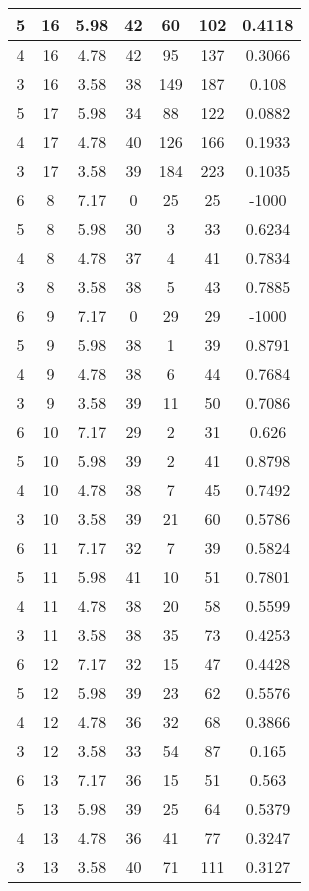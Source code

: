 \documentclass[letterpaper, 12pt]{article}
\begin{document}
\begin{longtable}{|c|c|c|c|c|c|c|}
\hline
5 & 16 & 5.98 & 42 & 60 & 102 & 0.4118 \\
\hline
4 & 16 & 4.78 & 42 & 95 & 137 & 0.3066 \\
\hline
3 & 16 & 3.58 & 38 & 149 & 187 & 0.108 \\
\hline
5 & 17 & 5.98 & 34 & 88 & 122 & 0.0882 \\
\hline
4 & 17 & 4.78 & 40 & 126 & 166 & 0.1933 \\
\hline
3 & 17 & 3.58 & 39 & 184 & 223 & 0.1035 \\
\hline
6 & 8 & 7.17 & 0 & 25 & 25 & -1000 \\
\hline
5 & 8 & 5.98 & 30 & 3 & 33 & 0.6234 \\
\hline
4 & 8 & 4.78 & 37 & 4 & 41 & 0.7834 \\
\hline
3 & 8 & 3.58 & 38 & 5 & 43 & 0.7885 \\
\hline
6 & 9 & 7.17 & 0 & 29 & 29 & -1000 \\
\hline
5 & 9 & 5.98 & 38 & 1 & 39 & 0.8791 \\
\hline
4 & 9 & 4.78 & 38 & 6 & 44 & 0.7684 \\
\hline
3 & 9 & 3.58 & 39 & 11 & 50 & 0.7086 \\
\hline
6 & 10 & 7.17 & 29 & 2 & 31 & 0.626 \\
\hline
5 & 10 & 5.98 & 39 & 2 & 41 & 0.8798 \\
\hline
4 & 10 & 4.78 & 38 & 7 & 45 & 0.7492 \\
\hline
3 & 10 & 3.58 & 39 & 21 & 60 & 0.5786 \\
\hline
6 & 11 & 7.17 & 32 & 7 & 39 & 0.5824 \\
\hline
5 & 11 & 5.98 & 41 & 10 & 51 & 0.7801 \\
\hline
4 & 11 & 4.78 & 38 & 20 & 58 & 0.5599 \\
\hline
3 & 11 & 3.58 & 38 & 35 & 73 & 0.4253 \\
\hline
6 & 12 & 7.17 & 32 & 15 & 47 & 0.4428 \\
\hline
5 & 12 & 5.98 & 39 & 23 & 62 & 0.5576 \\
\hline
4 & 12 & 4.78 & 36 & 32 & 68 & 0.3866 \\
\hline
3 & 12 & 3.58 & 33 & 54 & 87 & 0.165 \\
\hline
6 & 13 & 7.17 & 36 & 15 & 51 & 0.563 \\
\hline
5 & 13 & 5.98 & 39 & 25 & 64 & 0.5379 \\
\hline
4 & 13 & 4.78 & 36 & 41 & 77 & 0.3247 \\
\hline
3 & 13 & 3.58 & 40 & 71 & 111 & 0.3127 \\

\end{longtable}
\end{document}
